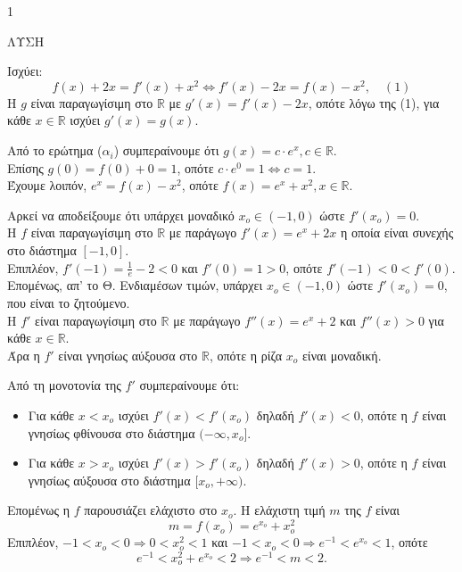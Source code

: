\begin{ylh}{1}
    \item [Διαφορικός Λογισμός]
\end{ylh}
ΛΥΣΗ
\begin{alist}
    \item 
    \begin{rlist}
        \item Ισχύει:
        \[f(x)+2x = f'(x)+x^2 \Leftrightarrow f'(x)-2x = f(x)-x^2, \quad (1)\]
        Η $g$ είναι παραγωγίσιμη στο $\mathbb{R}$ με $g'(x)=f'(x)-2x$, οπότε λόγω της (1), για κάθε $x \in \mathbb{R}$ ισχύει $g'(x)=g(x)$.
        \item Από το ερώτημα ($\alpha_{i}$) συμπεραίνουμε ότι $g(x)=c \cdot e^x, c \in \mathbb{R}$. \\
        Επίσης $g(0)=f(0)+0=1$, οπότε $c \cdot e^0 = 1 \Leftrightarrow c=1$. \\
        Έχουμε λοιπόν, $e^x = f(x)-x^2$, οπότε $f(x)=e^x+x^2, x \in \mathbb{R}$.
    \end{rlist}
    \item 
    \begin{rlist}
        \item Αρκεί να αποδείξουμε ότι υπάρχει μοναδικό $x_o \in (-1,0)$ ώστε $f'(x_o)=0$. \\
        Η $f$ είναι παραγωγίσιμη στο $\mathbb{R}$ με παράγωγο $f'(x)=e^x+2x$ η οποία είναι συνεχής στο διάστημα $[-1,0]$. \\
        Επιπλέον, $f'(-1)=\frac{1}{e}-2<0$ και $f'(0)=1>0$, οπότε $f'(-1)<0<f'(0)$. \\
        Επομένως, απ' το Θ. Ενδιαμέσων τιμών, υπάρχει $x_o \in (-1,0)$ ώστε $f'(x_o)=0$, που είναι το ζητούμενο. \\
        Η $f'$ είναι παραγωγίσιμη στο $\mathbb{R}$ με παράγωγο $f''(x)=e^x+2$ και $f''(x)>0$ για κάθε $x \in \mathbb{R}$. \\
        Άρα η $f'$ είναι γνησίως αύξουσα στο $\mathbb{R}$, οπότε η ρίζα $x_o$ είναι μοναδική.
        \item Από τη μονοτονία της $f'$ συμπεραίνουμε ότι:
        \begin{itemize}
            \item Για κάθε $x < x_o$ ισχύει $f'(x) < f'(x_o)$ δηλαδή $f'(x) < 0$, οπότε η $f$ είναι γνησίως φθίνουσα στο διάστημα $(-\infty, x_o]$.
            \item Για κάθε $x > x_o$ ισχύει $f'(x) > f'(x_o)$ δηλαδή $f'(x) > 0$, οπότε η $f$ είναι γνησίως αύξουσα στο διάστημα $[x_o, +\infty)$.
        \end{itemize}
        Επομένως η $f$ παρουσιάζει ελάχιστο στο $x_o$. Η ελάχιστη τιμή $m$ της $f$ είναι
        \[m=f(x_o)=e^{x_o}+x_o^2\]
        Επιπλέον, $-1 < x_o < 0 \Rightarrow 0 < x_o^2 < 1$ και $-1 < x_o < 0 \Rightarrow e^{-1} < e^{x_o} < 1$, οπότε
        \[e^{-1} < x_o^2+e^{x_o} < 2 \Rightarrow e^{-1} < m < 2.\]
    \end{rlist}
\end{alist}